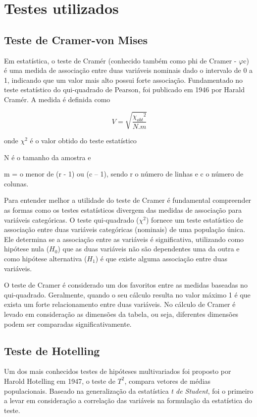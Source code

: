 \section{Testes utilizados}
\subsection{Teste de Cramer-von Mises}
Em estatística, o teste de Cramér (conhecido também como phi de Cramer - $\varphi$c) é uma medida de associação entre duas variáveis nominais dado o intervalo de 0 a 1, indicando que um valor mais alto possui forte associação. Fundamentado no teste estatístico do qui-quadrado de Pearson, foi publicado em 1946 por Harald Cramér. A medida é definida como

\begin{equation}
\ V = \sqrt{\frac{{\chi_{obt}}^2}{N.m}}
\label{eq:eq1}
\end{equation}
	
	onde $\chi^2$ é o valor obtido do teste estatístico
	
	N é o tamanho da amostra e 
    
    m = o menor de (r - 1) ou (c – 1), sendo r o número de linhas e c o número de colunas.

Para entender melhor a utilidade do teste de Cramer é fundamental compreender as formas como os testes estatísticos divergem das medidas de associação para variáveis categóricas. O teste qui-quadrado ($\chi^2$) fornece um teste estatístico de associação entre duas variáveis categóricas (nominais) de uma população única. Ele determina se a associação entre as variáveis é significativa, utilizando como hipótese nula ($H_0$) que as duas variáveis não são dependentes uma da outra e como hipótese alternativa ($H_1$) é que existe alguma associação entre duas variáveis.

O teste de Cramer é considerado um dos favoritos entre as medidas baseadas no qui-quadrado. Geralmente, quando o seu cálculo resulta no valor máximo 1 é que exista um forte relacionamento entre duas variáveis. No cálculo de Cramer é levado em consideração as dimensões da tabela, ou seja, diferentes dimensões podem ser comparadas significativamente.

\subsection{Teste de Hotelling}

Um dos mais conhecidos testes de hipóteses multivariados foi proposto por Harold Hotelling em 1947, o teste de $T^2$, compara vetores de médias populacionais. Baseado na generalização da estatística \textit{t de Student}, foi o primeiro a levar em consideração a correlação das variáveis na formulação da estatística do teste.

